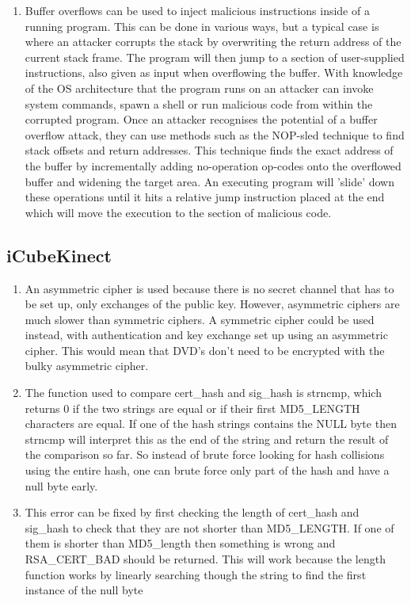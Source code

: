 \documentclass[9pt,a4paper]{article}
\begin{document}
\begin{enumerate}
\item 
Buffer overflows can be used to inject malicious instructions inside of a running program. This can be done in various ways, but a typical case is where an attacker corrupts the stack by overwriting the return address of the current stack frame. The program will then jump to a section of user-supplied instructions, also given as input when overflowing the buffer. With knowledge of the OS architecture that the program runs on an attacker can invoke system commands, spawn a shell or run malicious code from within the corrupted program. Once an attacker recognises the potential of a buffer overflow attack, they can use methods such as the NOP-sled technique to find stack offsets and return addresses. This technique finds the exact address of the buffer by incrementally adding no-operation op-codes onto the overflowed buffer and widening the target area. An executing program will 'slide' down these operations until it hits a relative jump instruction placed at the end which will move the execution to the section of malicious code.
\end{enumerate}

\subsection{iCubeKinect}
\begin{enumerate}
\item An asymmetric cipher is used because there is no secret channel that has to be set up, only exchanges of the public key. However, asymmetric ciphers are much slower than symmetric ciphers. A symmetric cipher could be used instead, with authentication and key exchange set up using an asymmetric cipher. This would mean that DVD's don't need to be encrypted with the bulky asymmetric cipher.
\item The function used to compare cert\_hash and sig\_hash is strncmp, which returns 0 if the two strings are equal or if their first MD5\_LENGTH characters are equal. If one of the hash strings contains the NULL byte then strncmp will interpret this as the end of the string and return the result of the comparison so far. So instead of brute force looking for hash collisions using the entire hash, one can brute force only part of the hash and have a null byte early.
\item This error can be fixed by first checking the length of cert\_hash and sig\_hash to check that they are not shorter than MD5\_LENGTH. If one of them is shorter than MD5\_length then something is wrong and RSA\_CERT\_BAD should be returned. This will work because the length function works by linearly searching though the string to find the first instance of the null byte
\end{enumerate}
\end{document}
